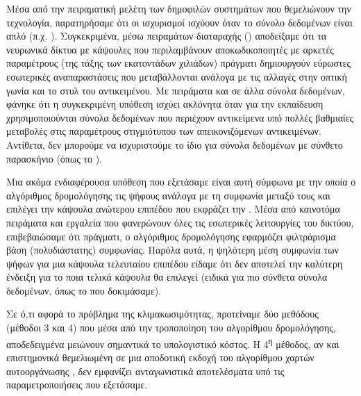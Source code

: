 Μέσα από την πειραματική μελέτη των δημοφιλών συστημάτων που θεμελιώνουν την τεχνολογία, παρατηρήσαμε ότι οι ισχυρισμοί ισχύουν όταν το σύνολο δεδομένων είναι απλό (π.χ. ). Συγκεκριμένα, μέσω πειραμάτων διαταραχής () αποδείξαμε ότι τα νευρωνικά δίκτυα με κάψουλες που περιλαμβάνουν αποκωδικοποιητές με αρκετές παραμέτρους (της τάξης των εκατοντάδων χιλιάδων) πράγματι δημιουργούν εύρωστες εσωτερικές αναπαραστάσεις που μεταβάλλονται ανάλογα με τις αλλαγές στην οπτική γωνία και το στυλ του αντικειμένου. Με πειράματα και σε άλλα σύνολα δεδομένων, φάνηκε ότι η συγκεκριμένη υπόθεση ισχύει ακλόνητα όταν για την εκπαίδευση χρησιμοποιούνται σύνολα δεδομένων που περιέχουν αντικείμενα υπό πολλές βαθμιαίες μεταβολές στις  παραμέτρους στιγμιότυπου των απεικονιζόμενων αντικειμένων. Αντίθετα, δεν μπορούμε να ισχυριστούμε το ίδιο για σύνολα δεδομένων με σύνθετο παρασκήνιο (όπως το ).\par

Μια ακόμα ενδιαφέρουσα υπόθεση που εξετάσαμε είναι αυτή σύμφωνα με την οποία ο αλγόριθμος δρομολόγησης  τις ψήφους ανάλογα με τη συμφωνία μεταξύ τους και επιλέγει την κάψουλα ανώτερου επιπέδου που εκφράζει την . Μέσα από καινοτόμα πειράματα και εργαλεία που φανερώνουν όλες τις εσωτερικές  λειτουργίες του δικτύου, επιβεβαιώσαμε ότι πράγματι, ο αλγόριθμος δρομολόγησης εφαρμόζει φιλτράρισμα βάση (πολυδιάστατης) συμφωνίας. Παρόλα αυτά, η ψηλότερη μέση συμφωνία των ψήφων για μια κάψουλα τελευταίου επιπέδου είδαμε ότι δεν αποτελεί την καλύτερη ένδειξη για το ποια τελικά κάψουλα θα επιλεγεί (ειδικά για πιο σύνθετα σύνολα δεδομένων, όπως το  που δοκιμάσαμε).

Σε ό,τι αφορά το πρόβλημα της κλιμακωσιμότητας, προτείναμε δύο μεθόδους (μέθοδοι 3 και 4) που μέσα από την τροποποίηση του αλγορίθμου δρομολόγησης, αποδεδειγμένα μειώνουν σημαντικά το υπολογιστικό κόστος. Η 4\textsuperscript{η} μέθοδος, αν και επιστημονικά θεμελιωμένη σε μια αποδοτική εκδοχή του αλγορίθμου χαρτών αυτο\textendash οργάνωσης , δεν εμφανίζει ανταγωνιστικά αποτελέσματα υπό τις παραμετροποιήσεις που εξετάσαμε.\par

